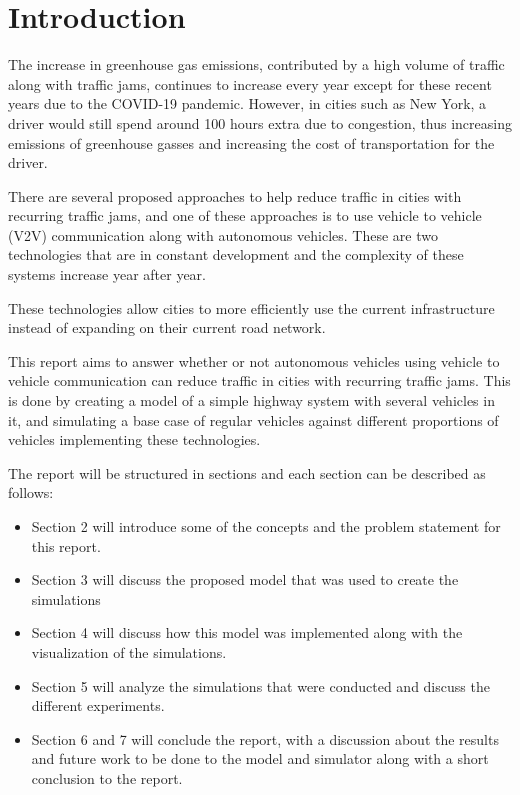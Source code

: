 \section{Introduction }
The increase in greenhouse gas emissions, contributed by a high volume of traffic along with traffic jams, continues to increase every year except for these recent years due to the COVID-19 pandemic. However, in cities such as New York, a driver would still spend around 100 hours extra due to congestion\cite{TrafficReport}, thus increasing emissions of greenhouse gasses and increasing the cost of transportation for the driver.

There are several proposed approaches to help reduce traffic in cities with recurring traffic jams, and one of these approaches is to use vehicle to vehicle (V2V) communication along with autonomous vehicles. These are two technologies that are in constant development and the complexity of these systems increase year after year.

These technologies allow cities to more efficiently use the current infrastructure instead of expanding on their current road network.

This report aims to answer whether or not autonomous vehicles using vehicle to vehicle communication can reduce traffic in cities with recurring traffic jams. This is done by creating a model of a simple highway system with several vehicles in it, and simulating a base case of regular vehicles against different proportions of vehicles implementing these technologies.

The report will be structured in sections and each section can be described as follows: 
\begin{itemize}
    \item Section 2 will introduce some of the concepts and the problem statement for this report.
    \item Section 3 will discuss the proposed model that was used to create the simulations
    \item Section 4 will discuss how this model was implemented along with the visualization of the simulations.
    \item Section 5 will analyze the simulations that were conducted and discuss the different experiments.
    \item Section 6 and 7 will conclude the report, with a discussion about the results and future work to be done to the model and simulator along with a short conclusion to the report.
\end{itemize}